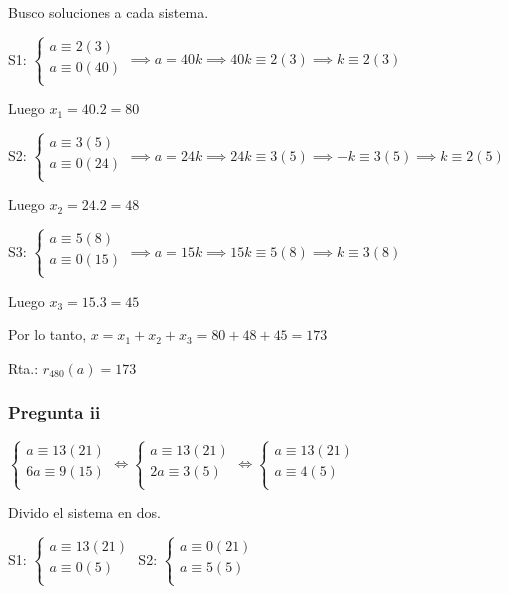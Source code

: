 Busco soluciones a cada sistema.

S1: $ \begin{cases}
    a\equiv 2(3) \\
    a\equiv 0(40) \\
\end{cases} \implies a = 40k \implies 40k \equiv 2(3) \implies k \equiv 2(3) $

Luego $ x_1 = 40.2 = 80 $

S2: $ \begin{cases}
    a\equiv 3(5) \\
    a\equiv 0(24) \\
\end{cases} \implies a = 24k \implies 24k \equiv 3(5) \implies -k \equiv 3(5) \implies k \equiv 2(5) $

Luego $ x_2 = 24.2 = 48 $

S3: $ \begin{cases}
    a\equiv 5(8) \\
    a\equiv 0(15) \\
\end{cases} \implies a = 15k \implies 15k \equiv 5(8) \implies k \equiv 3(8) $

Luego $ x_3 = 15.3 = 45 $

Por lo tanto, $ x = x_1 + x_2 + x_3 = 80+48+45 = 173 $

Rta.: $ r_{480}(a) = 173 $

\subsubsection{Pregunta ii}

$ \begin{cases}
    a\equiv 13(21) \\
    6a\equiv 9(15) \\
\end{cases} 
\iff \begin{cases}
    a \equiv 13(21) \\
    2a \equiv 3(5) \\
\end{cases}
\iff \begin{cases}
    a \equiv 13(21) \\
    a \equiv 4(5) \\
\end{cases} $

Divido el sistema en dos.

S1: $ \begin{cases}
    a \equiv 13(21) \\
    a \equiv 0(5) \\
\end{cases} $
S2: $ \begin{cases}
    a \equiv 0(21) \\
    a \equiv 5(5) \\
\end{cases} $

